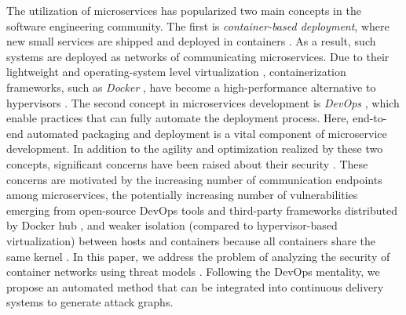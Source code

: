 The utilization of microservices has popularized two main concepts in the software engineering community. The first is \textit{container-based deployment}, where new small services are shipped and deployed in containers \cite{jaramillo2016leveraging}. As a result, such systems are deployed as networks of communicating microservices. Due to their lightweight and operating-system level virtualization \cite{bottomely}, containerization frameworks, such as \textit{Docker} \cite{cerny2018contextual}, have become a high-performance alternative to hypervisors \cite{kratzke2017microservices}. The second concept in microservices development is \textit{DevOps} \cite{cerny2018contextual}, which enable practices that can fully automate the deployment process. Here, end-to-end automated packaging and deployment is a vital component of microservice development. In addition to the agility and optimization realized by these two concepts, significant concerns have been raised about their security \cite{ahmadvand2016requirements}. These concerns are motivated by the increasing number of communication endpoints among microservices, the potentially increasing number of vulnerabilities emerging from open-source DevOps tools and third-party frameworks distributed by Docker hub \cite{shu2017study,gummaraju2015over}, and weaker isolation (compared to hypervisor-based virtualization) between hosts and containers because all containers share the same kernel \cite{bottomely, bui2015analysis}. In this paper, we address the problem of analyzing the security of container networks using threat models \cite{kordy2014dag}. Following the DevOps mentality, we propose an automated method that can be integrated into continuous delivery systems to generate attack graphs.



